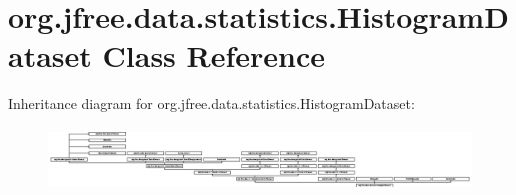 \hypertarget{classorg_1_1jfree_1_1data_1_1statistics_1_1_histogram_dataset}{}\section{org.\+jfree.\+data.\+statistics.\+Histogram\+Dataset Class Reference}
\label{classorg_1_1jfree_1_1data_1_1statistics_1_1_histogram_dataset}
Inheritance diagram for org.\+jfree.\+data.\+statistics.\+Histogram\+Dataset\+:\begin{figure}[H]
\begin{center}
\leavevmode
\includegraphics[height=1.678322cm]{classorg_1_1jfree_1_1data_1_1statistics_1_1_histogram_dataset}
\end{center}
\end{figure}
